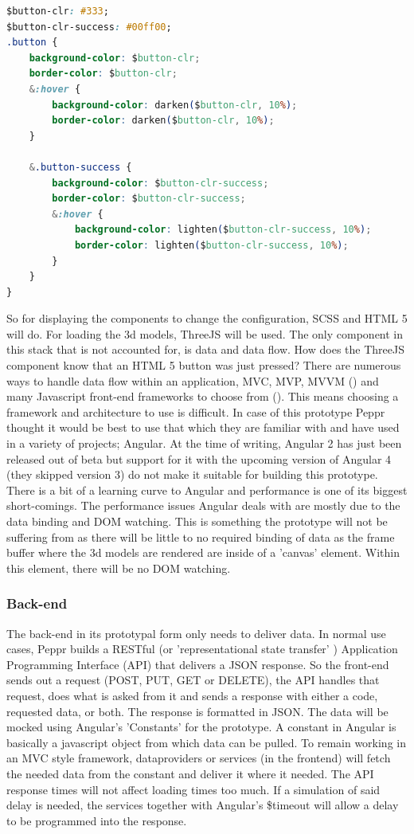 \begin{lstlisting}[language=CSS]
$button-clr: #333;
$button-clr-success: #00ff00;
.button {
	background-color: $button-clr;
	border-color: $button-clr;
	&:hover {
		background-color: darken($button-clr, 10%);
		border-color: darken($button-clr, 10%);
	}
	
	&.button-success {
		background-color: $button-clr-success;
		border-color: $button-clr-success;
		&:hover {
			background-color: lighten($button-clr-success, 10%);
			border-color: lighten($button-clr-success, 10%);
		}
	}
}
\end{lstlisting}

So for displaying the components to change the configuration, SCSS and HTML 5 will do. For loading the 3d models, ThreeJS will be used. The only component in this stack that is not accounted for, is data and data flow. How does the ThreeJS component know that an HTML 5 button was just pressed? There are numerous ways to handle data flow within an application, MVC, MVP, MVVM (\cite{MVCMVPMVVM}) and many Javascript front-end frameworks to choose from (\cite{javascriptAnno2016}). This means choosing a framework and architecture to use is difficult. In case of this prototype Peppr thought it would be best to use that which they are familiar with and have used in a variety of projects; Angular. At the time of writing, Angular 2 has just been released out of beta but support for it with the upcoming version of Angular 4 (they skipped version 3) do not make it suitable for building this prototype.
There is a bit of a learning curve to Angular and performance is one of its biggest short-comings. The performance issues Angular deals with are mostly due to the data binding and DOM watching. This is something the prototype will not be suffering from as there will be little to no required binding of data as the frame buffer where the 3d models are rendered are inside of a 'canvas' element. Within this element, there will be no DOM watching.

\subsubsection{Back-end}
\label{subsub: backEnd}
The back-end in its prototypal form only needs to deliver data. In normal use cases, Peppr builds a RESTful (or 'representational state transfer' \cite{RESTful} ) Application Programming Interface (API) that delivers a JSON response. So the front-end sends out a request (POST, PUT, GET or DELETE), the API handles that request, does what is asked from it and sends a response with either a code, requested data, or both. The response is formatted in JSON. 
The data will be mocked using Angular's 'Constants' for the prototype. A constant in Angular is basically a javascript object from which data can be pulled. To remain working in an MVC style framework, dataproviders or services (in the frontend) will fetch the needed data from the constant and deliver it where it needed. The API response times will not affect loading times too much. If a simulation of said delay is needed, the services together with Angular's \$timeout will allow a delay to be programmed into the response.

